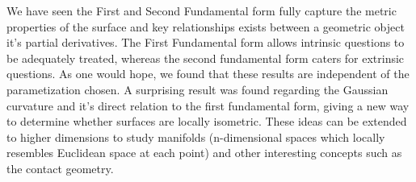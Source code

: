 \documentclass{UKZNcomp}
\theoremstyle{definition}
\theoremstyle{remark}
\begin{document}
We have seen the First and Second Fundamental form fully capture the metric properties of the surface and key relationships exists between a geometric object it's partial derivatives. The First Fundamental form allows intrinsic questions to be adequately treated, whereas the second fundamental form caters for extrinsic questions. As one would hope, we found that these results are independent of the parametization chosen. A surprising result was found regarding the Gaussian curvature and it's direct relation to the first fundamental form, giving a new way to determine whether surfaces are locally isometric.  These ideas can be extended to higher dimensions to study manifolds (n-dimensional spaces which locally resembles Euclidean space at each point) and other interesting concepts such as the contact geometry.



 
 

 \cleardoublepage
 \singlespace
 \printindex
\end{document}
